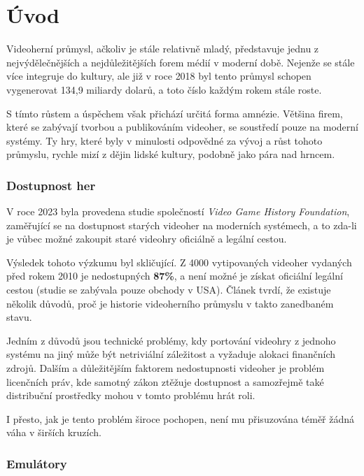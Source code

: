 \chapter{Úvod}
\label{introduction}

Videoherní průmysl, ačkoliv je stále relativně mladý, představuje
jednu z nejvýdělečnějších a nejdůležitějších forem médií v moderní době.
Nejenže se stále více integruje do kultury, ale již v roce 2018 byl
tento průmysl schopen vygenerovat 134,9 miliardy dolarů\cite{VideoGameProfit}, a toto číslo každým rokem stále roste.

S tímto růstem a úspěchem však přichází určitá forma amnézie. 
Většina firem, které se zabývají tvorbou a publikováním videoher, se soustředí pouze na moderní systémy. 
Ty hry, které byly v minulosti odpovědné za vývoj a růst tohoto průmyslu, rychle mizí z dějin lidské kultury, podobně jako pára nad hrncem.

\subsection{Dostupnost her}

V roce 2023 byla provedena studie\cite{VideoGameSurvery} společností \textit{Video Game History Foundation}, 
zaměřující se na dostupnost starých videoher na moderních systémech, 
a to zda-li je vůbec možné zakoupit staré videohry oficiálně a legální cestou.

Výsledek tohoto výzkumu byl skličující. 
Z 4000 vytipovaných videoher vydaných před rokem 2010 je nedostupných \textbf{87\%}\cite{VideoGameSurvery}, 
a není možné je získat oficiální legální cestou (studie se zabývala pouze obchody v USA). 
Článek tvrdí, že existuje několik důvodů, proč je historie videoherního průmyslu v takto zanedbaném stavu.

Jedním z důvodů jsou technické problémy, 
kdy portování videohry z jednoho systému na jiný může být netriviální záležitost 
a vyžaduje alokaci finančních zdrojů. Dalším a důležitějším faktorem nedostupnosti 
videoher je problém licenčních práv, kde samotný zákon ztěžuje dostupnost 
a samozřejmě také distribuční prostředky mohou v tomto problému hrát roli.

I přesto, jak je tento problém široce pochopen, není mu přisuzována téměř žádná váha v širších kruzích.

\subsection{Emulátory}

